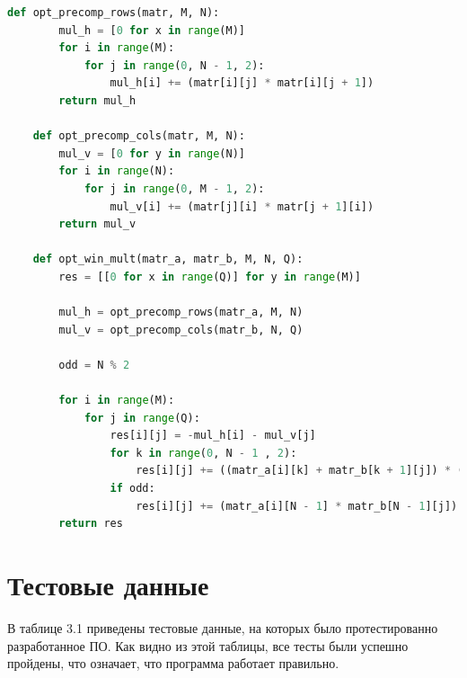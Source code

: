 \documentclass[12pt]{report}
\begin{document}
	\begin{lstlisting}[label=opt,caption=Оптимизированный алгоритм Винограда,language=Python]
	def opt_precomp_rows(matr, M, N):
		mul_h = [0 for x in range(M)]
		for i in range(M):
			for j in range(0, N - 1, 2):
				mul_h[i] += (matr[i][j] * matr[i][j + 1])
		return mul_h
	
	def opt_precomp_cols(matr, M, N):
		mul_v = [0 for y in range(N)]
		for i in range(N):
			for j in range(0, M - 1, 2):
				mul_v[i] += (matr[j][i] * matr[j + 1][i])
		return mul_v
	
	def opt_win_mult(matr_a, matr_b, M, N, Q):
		res = [[0 for x in range(Q)] for y in range(M)]
	
		mul_h = opt_precomp_rows(matr_a, M, N)
		mul_v = opt_precomp_cols(matr_b, N, Q)
	
		odd = N % 2
	
		for i in range(M):
			for j in range(Q):
				res[i][j] = -mul_h[i] - mul_v[j]
				for k in range(0, N - 1 , 2):
					res[i][j] += ((matr_a[i][k] + matr_b[k + 1][j]) * (matr_a[i][k + 1] + matr_b[k][j]))
				if odd:
					res[i][j] += (matr_a[i][N - 1] * matr_b[N - 1][j])
		return res
	\end{lstlisting}
	
	\section{Тестовые данные}
	
	В таблице 3.1 приведены тестовые данные, на которых было протестированно разработанное ПО. Как видно из этой таблицы, все тесты были успешно пройдены, что означает, что программа работает правильно.
	
\end{document}
